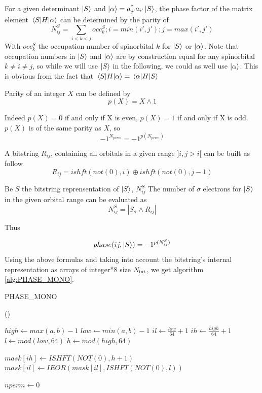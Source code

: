 \documentclass[./thesis.tex]{subfiles}
\begin{document}

For a given determinant $\ket S$ and $\ket{\alpha}=a^\dagger_{j'} a_{i'}  \ket S$, the phase factor of the matrix element $\mel{S}{H}{\alpha}$ can be determined by the parity of
$$N^{S}_{ij}=\sum_{i<k<j} occ^{S}_{k};i=min(i',j');j=max(i',j')$$
With $occ^{S}_{k}$ the occupation number of spinorbital $k$ for $\ket S$ or $\ket \alpha$. Note that occupation numbers in $\ket S$ and $\ket \alpha$ are by construction equal for any spinorbital $k \neq i \neq j$, so while we will use $\ket S$ in the following, we could as well use $\ket \alpha$. This is obvious from the fact that $\mel{S}{H}{\alpha}=\mel{\alpha}{H}{S}$  

Parity of an integer $X$ can be defined by $$p(X)=X \wedge 1$$
        
Indeed $p(X)=0$ if and only if X is even, $p(X)=1$ if and only if X is odd. $p(X)$ is of the same parity as $X$, so 
$$-1^{N_{perm}} = -1^{p(N_{perm})}$$
        
        

A bitstring $R_{ij}$, containing all orbitals in a given range $]i, j>i[$ can be built as follow
$$R_{ij}=ishft(not(0),i) \oplus ishft(not(0),j-1)$$


Be $S$ the bitstring reprensentation of $\ket S$, $N^{S}_{ij}$ The number of $\sigma$ electrons for $\ket S$ in the given orbital range can be evaluated as
$$N^{S}_{ij} = |S_\sigma \wedge R_{ij}|$$

Thus 

$$phase(ij, \ket S) = -1^{p(N^S_{ij})}$$
Using the above formulas and taking into account the bitstring's internal representation as arrays of integer*8 size ${N_\text{int}}$, we get algorithm \ref{alg:PHASE_MONO}.   


\begin{algorithm}
	\caption{PHASE\_MONO}	
	\label{alg:PHASE_MONO}
	
	\Fn(){}{
		$high \gets max(a,b)-1$ \;
		$low \gets min(a,b)-1$ \;
		$il \gets \frac{low}{64} + 1$ \;
		$ih \gets \frac{high}{64} + 1$ \;
		$l \gets mod(low, 64)$ \;
		$h \gets mod(high, 64)$ \; 

		
		$mask[ih] \gets ISHFT(NOT(0), h+1)$ \;
		$mask[il] \gets IEOR(mask[il], ISHFT(NOT(0), l))$ \;
		
		
		$nperm \gets 0$ \;
		}
\end{algorithm}
        
\end{document}
